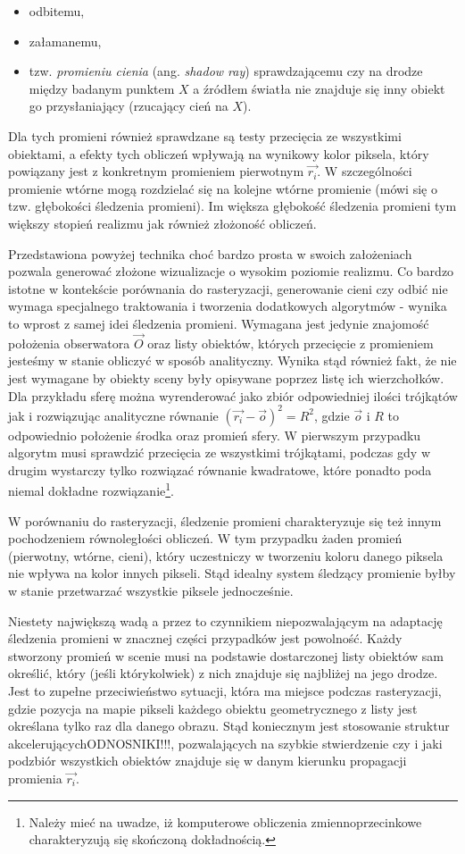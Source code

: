 \begin{itemize}
\item odbitemu,
\item załamanemu,
\item tzw. \textit{promieniu cienia} (ang. \textit{shadow ray}) sprawdzającemu czy na drodze między badanym punktem $X$ a źródłem światła nie znajduje się inny obiekt go przysłaniający (rzucający cień na $X$).
\end{itemize}
Dla tych promieni również sprawdzane są testy przecięcia ze wszystkimi obiektami, a efekty tych obliczeń wpływają na wynikowy kolor piksela, który powiązany jest z konkretnym promieniem pierwotnym $\vec{r_i}$. W szczególności promienie wtórne mogą rozdzielać się na kolejne wtórne promienie (mówi się o tzw. głębokości śledzenia promieni). Im większa głębokość śledzenia promieni tym większy stopień realizmu jak również złożoność obliczeń.

Przedstawiona powyżej technika choć bardzo prosta w swoich założeniach pozwala generować złożone wizualizacje o wysokim poziomie realizmu. Co bardzo istotne w kontekście porównania do rasteryzacji, generowanie cieni czy odbić nie wymaga specjalnego traktowania i tworzenia dodatkowych algorytmów - wynika to wprost z samej idei śledzenia promieni. Wymagana jest jedynie znajomość położenia obserwatora $\vec{O}$ oraz listy obiektów, których przecięcie z promieniem jesteśmy w stanie obliczyć w sposób analityczny. Wynika stąd również fakt, że nie jest wymagane by obiekty sceny były opisywane poprzez listę ich wierzchołków. Dla przykładu sferę można wyrenderować jako zbiór odpowiedniej ilości trójkątów jak i rozwiązując analityczne równanie $(\vec{r_i} - \vec{o})^2 = R^2$, gdzie $\vec{o}$ i $R$ to odpowiednio położenie środka oraz promień sfery. W pierwszym przypadku algorytm musi sprawdzić przecięcia ze wszystkimi trójkątami, podczas gdy w drugim wystarczy tylko rozwiązać równanie kwadratowe, które ponadto poda niemal dokładne rozwiązanie\footnote{Należy mieć na uwadze, iż komputerowe obliczenia zmiennoprzecinkowe charakteryzują się skończoną dokładnością.}. 

W porównaniu do rasteryzacji, śledzenie promieni charakteryzuje się też innym pochodzeniem równoległości obliczeń. W tym przypadku żaden promień (pierwotny, wtórne, cieni), który uczestniczy w tworzeniu koloru danego piksela nie wpływa na kolor innych pikseli. Stąd idealny system śledzący promienie byłby w stanie przetwarzać wszystkie piksele jednocześnie.

Niestety największą wadą a przez to czynnikiem niepozwalającym na adaptację śledzenia promieni w znacznej części przypadków jest powolność. Każdy stworzony promień w scenie musi na podstawie dostarczonej listy obiektów sam określić, który (jeśli którykolwiek) z nich znajduje się najbliżej na jego drodze. Jest to zupełne przeciwieństwo sytuacji, która ma miejsce podczas rasteryzacji, gdzie pozycja na mapie pikseli każdego obiektu geometrycznego z listy jest określana tylko raz dla danego obrazu. Stąd koniecznym jest stosowanie struktur akcelerujących{\color{red}ODNOSNIKI!!!}, pozwalających na szybkie stwierdzenie czy i jaki podzbiór wszystkich obiektów znajduje się w danym kierunku propagacji promienia $\vec{r_i}$.
\newline

